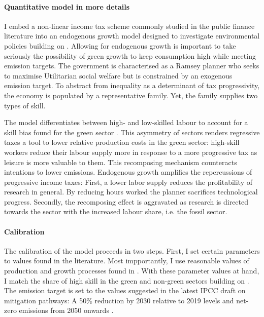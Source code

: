 \paragraph{Quantitative model in more details}
I embed a non-linear income tax scheme commonly studied in the public finance literature \citep[e.g.][]{Heathcote2017OptimalFramework} into an endogenous growth model designed to investigate environmental policies building on \cite{Fried2018ClimateAnalysis}.  
Allowing for endogenous growth is important to take seriously the possibility of green growth to keep consumption high while meeting emission targets.
The government is characterised as a Ramsey planner who seeks to maximise Utilitarian social welfare but is constrained by an exogenous emission target. To abstract from inequality as a determinant of tax progressivity, the economy is populated by a representative family. Yet, the family supplies two types of skill. 

The model differentiates between high- and low-skilled labour to account for a skill bias found for the green sector \citep{Consoli2016DoCapital}. This asymmetry of sectors renders regressive taxes a tool to lower relative production costs in the green sector: high-skill workers reduce their labour supply more in response to a more progressive tax as leisure is more valuable to them. This recomposing mechanism counteracts intentions to lower emissions. %
Endogenous growth amplifies the repercussions of progressive income taxes:
First, a lower labor supply reduces the profitability of research in general. By reducing hours worked the planner sacrifices technological progress. Secondly, the recomposing effect is aggravated as research is directed towards the sector with the increased labour share, i.e. the fossil sector.

\paragraph{Calibration}
The calibration of the model proceeds in two steps. First, I set certain parameters to values found in the literature. Most impportantly, I use reasonable values of production and growth processes found in \cite{Fried2018ClimateAnalysis}. %
With these parameter values at hand, I match the share of high skill in the green and non-green sectors building on \cite{Consoli2016DoCapital}. The emission target is set to the values suggested in the latest IPCC draft on mitigation pathways: A 50\% reduction by 2030 relative to 2019 levels and  net-zero emissions from 2050 onwards \citep{IPCC2022}.

